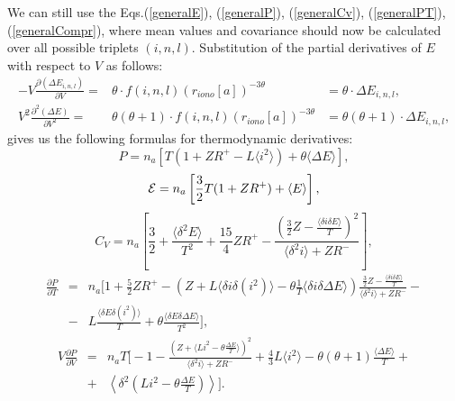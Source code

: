 We can still use the
Eqs.(\ref{generalE}), (\ref{generalP}), (\ref{generalCv}),
(\ref{generalPT}), (\ref{generalCompr}), where mean values and
covariance should now be calculated over all possible triplets $(i, n, l)$.
Substitution of the partial derivatives of $E$ with respect to $V$ as follows:
\begin{eqnarray}
-V \frac{\partial (\Delta E_{i,n,l})}{\partial V} =&
\theta \cdot f(i,n,l) (r_{iono}[a])^{-3 \theta} &=
\theta \cdot \Delta E_{i,n,l}, \\
V^2 \frac{\partial^2 (\Delta E)}{\partial V^2} =&
\theta (\theta + 1) \cdot f(i,n,l) (r_{iono}[a])^{-3 \theta} &=
\theta (\theta + 1) \cdot \Delta E_{i,n,l},
\end{eqnarray}
gives us the following formulas for thermodynamic derivatives:
\begin{equation}
P = n_a \left[ T(1 + ZR^+ - L \langle i^2 \rangle) +
\theta \langle \Delta E \rangle \right],
\end{equation}
\begin{equation}
{\cal E} = n_a \left[ \frac32 T (1 + ZR^+) + \langle E \rangle \right],
\end{equation}
\begin{equation}
C_V = n_a \left[ \frac32 + \frac{\langle \delta^2 E \rangle}{T^2} +
\frac{15}{4} ZR^+ - \frac{(\frac32 Z - \frac{\langle \delta i \delta E \rangle}{T})^2}
{\langle \delta^2 i \rangle + ZR^-} \right],
\end{equation}
\begin{eqnarray}
\nonumber \frac{\partial P}{\partial T} &=& n_a \Biggl[ 1 + \frac52 ZR^+ -
 \left( Z + L \langle \delta i \delta (i^2) \rangle
- \theta \frac{1}{T} \langle \delta i \delta \Delta E \rangle \right)
\frac{\frac32 Z - \frac{\langle \delta i \delta E \rangle}{T}}
{\langle \delta^2 i \rangle + ZR^-} - \\
&-& L \frac{\langle \delta E \delta (i^2) \rangle}{T} +
\theta \frac{\langle \delta E \delta \Delta E \rangle}{T^2} \Biggr],
\end{eqnarray}
\begin{eqnarray}
\nonumber V \frac{\partial P}{\partial V} &=& n_a T \Biggl[ -1 -
\frac{(Z + \langle Li^2 - \theta \frac{\Delta E}{T} \rangle)^2}
{\langle \delta^2 i \rangle + ZR^-} +
\frac43 L \langle i^2 \rangle -
\theta (\theta+1) \frac{\langle \Delta E \rangle}{T} + \\
&+& \left\langle \delta^2 \left( Li^2 - \theta \frac{\Delta E}{T} \right) \right\rangle \Biggr].
\end{eqnarray}


